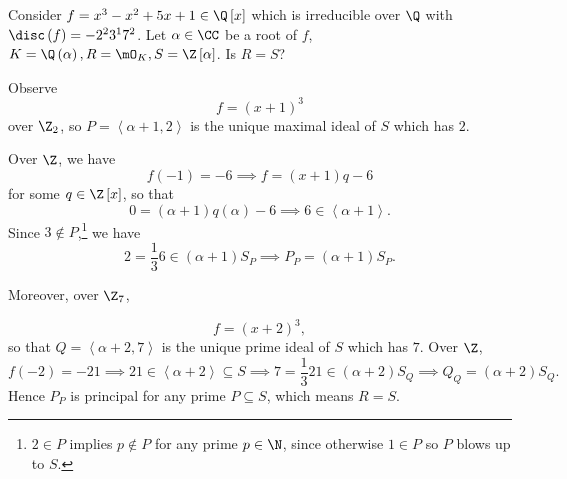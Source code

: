\documentclass[pmath441]{subfiles}
\begin{document}
    \begin{example}{}
        Consider $f=x^{3}-x^{2}+5x+1\in\Q\left[ x \right]$ which is irreducible over $\Q$ with $\disc\left( f \right) = -2^{2}3^17^2$. Let $\alpha\in\CC$ be a root of $f$, $K=\Q\left( \alpha \right),R=\mO_K,S=\Z\left[ \alpha \right]$. Is $R=S$?
    \end{example}

    \begin{answer}
        Observe
        \begin{equation*}
            f = \left( x+1 \right)^{3}
        \end{equation*}
        over $\Z_2$, so $P=\left< \alpha+1,2 \right>$ is the unique maximal ideal of $S$ which has $2$.

        Over $\Z$, we have
        \begin{equation*}
            f\left( -1 \right) = -6 \implies f = \left( x+1 \right)q-6
        \end{equation*}
        for some $q\in\Z\left[ x \right]$, so that
        \begin{equation*}
            0 = \left( \alpha+1 \right)q\left( \alpha \right)-6 \implies 6\in\left< \alpha+1 \right>. 
        \end{equation*}
        Since $3\notin P$,\footnote{$2\in P$ implies $p\notin P$ for any prime $p\in\N$, since otherwise $1\in P$ so $P$ blows up to $S$.} we have
        \begin{equation*}
            2 = \frac{1}{3}6 \in \left( \alpha+1 \right)S_P \implies P_P = \left( \alpha+1 \right)S_P.
        \end{equation*}

        Moreover, over $\Z_7$,

        \begin{equation*}
            f = \left( x+2 \right)^{3},
        \end{equation*}
        so that $Q= \left< \alpha+2,7 \right>$ is the unique prime ideal of $S$ which has $7$. Over $\Z$,
        \begin{equation*}
            f\left( -2 \right) = -21 \implies 21\in\left< \alpha+2 \right>\subseteq S \implies 7 = \frac{1}{3} 21\in\left( \alpha+2 \right)S_Q \implies Q_Q = \left( \alpha+2 \right)S_Q.
        \end{equation*}
        Hence $P_P$ is principal for any prime $P\subseteq S$, which means $R=S$.
    \end{answer}

    \clearpage
    
\end{document}
